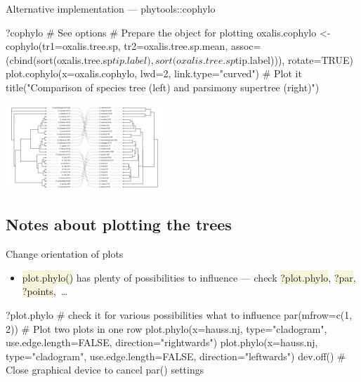\documentclass[compress, ucs, xelatex, 11pt, xcolor=svgnames, aspectratio=169,
	hyperref={
		bookmarks=true,
		unicode=true,
		colorlinks=true,
		pdftitle={Molecular data in R},
		plainpages=false,
		pdfauthor={Vojtech Zeisek},
		pdfsubject={Course about phylogeny and evolution in R},
		pdfcreator={XeLaTeX},
		pdfkeywords={R, evolution, phylogeny, molecular data},
		linkcolor=Crimson, %
		anchorcolor=Magenta, %
		citecolor=Magenta, %
		filecolor=Magenta, %
		menucolor=Magenta, %
		urlcolor=DodgerBlue, %
		pdftex},
	url={hyphens, lowtilde} %
	]{beamer}
\renewcommand{\texttt}[1]{\colorbox{Beige}{{\ttfamily #1}}}
\begin{document}
\begin{frame}[fragile]{Alternative implementation --- phytools::cophylo}
	\begin{spluscode}
    ?cophylo # See options
    # Prepare the object for plotting
    oxalis.cophylo <- cophylo(tr1=oxalis.tree.sp, tr2=oxalis.tree.sp.mean,
      assoc=(cbind(sort(oxalis.tree.sp$tip.label),
      sort(oxalis.tree.sp$tip.label))), rotate=TRUE)
    plot.cophylo(x=oxalis.cophylo, lwd=2, link.type="curved") # Plot it
    title("Comparison of species tree (left) and parsimony supertree (right)")
	\end{spluscode}
	\begin{center}
		\includegraphics[height=3.25cm]{cophylo.png}
	\end{center}
\end{frame}

\subsection{Notes about plotting the trees}

\begin{frame}[fragile]{Change orientation of plots}
	\begin{itemize}
		\item \alert{\texttt{plot.phylo()} has plenty of possibilities to influence --- check \texttt{?plot.phylo}, \texttt{?par}, \texttt{?points},~\ldots}
	\end{itemize}
	\begin{spluscode}
    ?plot.phylo # check it for various possibilities what to influence
    par(mfrow=c(1, 2)) # Plot two plots in one row
    plot.phylo(x=hauss.nj, type="cladogram", use.edge.length=FALSE,
      direction="rightwards")
    plot.phylo(x=hauss.nj, type="cladogram", use.edge.length=FALSE,
      direction="leftwards")
    dev.off() # Close graphical device to cancel par() settings
	\end{spluscode}
	\begin{center}
		\texttt{[image: lr.png]}
	\end{center}
\end{frame}
\end{document}
